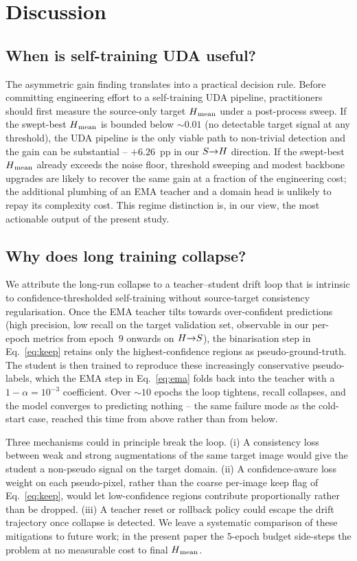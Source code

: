 \section{Discussion}
\label{sec:discussion}

\subsection{When is self-training UDA useful?}
The asymmetric gain finding translates into a practical decision rule.
Before committing engineering effort to a self-training UDA pipeline,
practitioners should first measure the source-only target $H\textsubscript{mean}$
under a post-process sweep. If the swept-best $H\textsubscript{mean}$ is bounded
below $\sim$$0.01$ (no detectable target signal at any threshold), the
UDA pipeline is the only viable path to non-trivial detection and the
gain can be substantial -- $+6.26$~pp in our $S{\rightarrow}H$ direction. If
the swept-best $H\textsubscript{mean}$ already exceeds the noise floor, threshold
sweeping and modest backbone upgrades are likely to recover the same
gain at a fraction of the engineering cost; the additional plumbing
of an EMA teacher and a domain head is unlikely to repay its complexity
cost. This regime distinction is, in our view, the most actionable
output of the present study.

\subsection{Why does long training collapse?}
We attribute the long-run collapse to a teacher--student drift loop
that is intrinsic to confidence-thresholded self-training without
source-target consistency regularisation. Once the EMA teacher tilts
towards over-confident predictions (high precision, low recall on the
target validation set, observable in our per-epoch metrics from
epoch~$9$ onwards on $H{\rightarrow}S$), the binarisation step in
Eq.~\ref{eq:keep} retains only the highest-confidence regions as
pseudo-ground-truth. The student is then trained to reproduce these
increasingly conservative pseudo-labels, which the EMA step in
Eq.~\ref{eq:ema} folds back into the teacher with a $1{-}\alpha
=10^{-3}$ coefficient. Over $\sim$$10$ epochs the loop tightens,
recall collapses, and the model converges to predicting nothing -- the
same failure mode as the cold-start case, reached this time from above
rather than from below.

Three mechanisms could in principle break the loop. (i) A consistency
loss between weak and strong augmentations of the same target image
would give the student a non-pseudo signal on the target domain.
(ii) A confidence-aware loss weight on each pseudo-pixel, rather than
the coarse per-image keep flag of Eq.~\ref{eq:keep}, would let
low-confidence regions contribute proportionally rather than be
dropped. (iii) A teacher reset or rollback policy could escape the
drift trajectory once collapse is detected. We leave a systematic
comparison of these mitigations to future work; in the present paper
the $5$-epoch budget side-steps the problem at no measurable cost to
final $H\textsubscript{mean}$.

